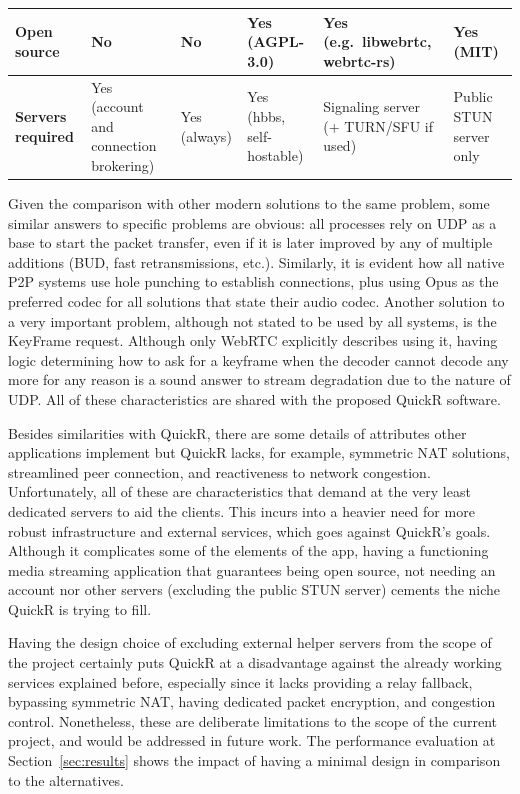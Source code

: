 \documentclass{article}
\begin{document}
\begin{xltabular}{\textwidth}{|>{\raggedright\arraybackslash\bfseries}p{2.4cm}|Y|Y|Y|Y|Y|}
            \hline
            Open source
                & No
                & No
                & Yes (AGPL-3.0)
                & Yes (e.g.\ libwebrtc, webrtc-rs)
                & Yes (MIT) \\
            \hline
            Servers required
                & Yes (account and connection brokering)
                & Yes (always)
                & Yes (hbbs, self-hostable)
                & Signaling server (+ TURN/SFU if used)
                & Public STUN server only \\
            \hline
        \end{xltabular}
    \endgroup

Given the comparison with other modern solutions to the same problem, some similar answers to specific problems are obvious: all processes rely on UDP as a base to start the packet transfer, even if it is later improved by any of multiple additions (BUD, fast retransmissions, etc.). 
Similarly, it is evident how all native P2P systems use hole punching to establish connections, plus using Opus as the preferred codec for all solutions that state their audio codec. Another solution to a very important problem, although not stated to be used by all systems, is the KeyFrame request. 
Although only WebRTC explicitly describes using it, having logic determining how to ask for a keyframe when the decoder cannot decode any more for any reason is a sound answer to stream degradation due to the nature of UDP. All of these characteristics are shared with the proposed QuickR software.

Besides similarities with QuickR, there are some details of attributes other applications implement but QuickR lacks, for example, symmetric NAT solutions, streamlined peer connection, and reactiveness to network congestion. Unfortunately, all of these are characteristics that demand at the very least
dedicated servers to aid the clients. This incurs into a heavier need for more robust infrastructure and external services, which goes against QuickR's goals. Although it complicates some of the elements of the app, having a functioning media streaming application that guarantees being open source, not
needing an account nor other servers (excluding the public STUN server) cements the niche QuickR is trying to fill.

Having the design choice of excluding external helper servers from the scope of the project certainly puts QuickR at a disadvantage against the already working services explained before, especially since it lacks providing a relay fallback, bypassing symmetric NAT, having dedicated packet encryption, and congestion control.
Nonetheless, these are deliberate limitations to the scope of the current project, and would be addressed in future work. The performance evaluation at Section~\ref{sec:results} shows the impact of having a minimal design in comparison to the alternatives. 
\end{document}
